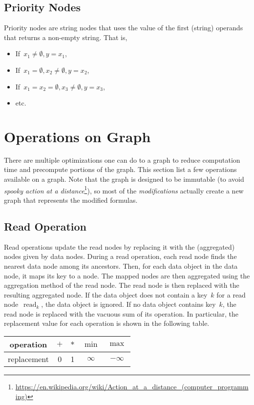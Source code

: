 \documentclass{article}
\DeclareMathOperator{\readNode}{read}
\begin{document}
\subsection{Priority Nodes}

Priority nodes are string nodes that uses the value of the first (string) operands that returns a non-empty string.
That is,

\begin{itemize}
	\item If~$x_1 \neq \emptyset, y = x_1$,
	\item If~$x_1 = \emptyset, x_2\neq\emptyset, y = x_2$,
	\item If~$x_1 = x_2 = \emptyset, x_3\neq\emptyset, y = x_3$,
	\item etc.
\end{itemize}

\section{Operations on Graph}

There are multiple optimizations one can do to a graph to reduce computation time and precompute portions of the graph.
This section list a few operations available on a graph.
Note that the graph is designed to be immutable (to avoid \emph{spooky action at a distance}\footnote{
	\url{https://en.wikipedia.org/wiki/Action_at_a_distance_(computer_programming)}
}), so most of the \emph{modifications} actually create a new graph that represents the modified formulas.

\subsection{Read Operation}
\label{sec:operation:read}

Read operations update the read nodes by replacing it with the (aggregated) nodes given by data nodes.
During a read operation, each read node finds the nearest data node among its ancestors.
Then, for each data object in the data node, it maps its key to a node.
The mapped nodes are then aggregated using the aggregation method of the read node.
The read node is then replaced with the resulting aggregated node.
If the data object does not contain a key~$k$ for a read node~$\readNode_k$, the data object is ignored.
If no data object contains key~$k$, the read node is replaced with the vacuous sum of its operation. In particular, the replacement value for each operation is shown in the following table.
%
\begin{center}
	\begin{tabular}{c|c|c|c|c}
		operation   & $+$ & $*$ & $\min$   & $\max$    \\
		\hline
		replacement & 0   & 1   & $\infty$ & $-\infty$
	\end{tabular}
\end{center}
\end{document}
